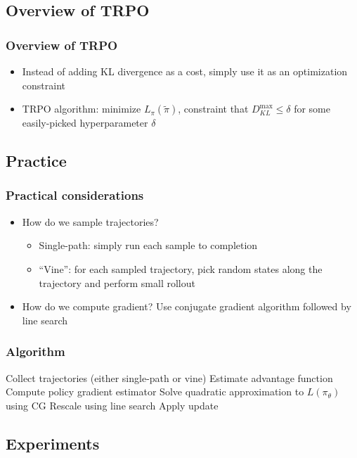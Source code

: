 \documentclass{beamer}
\begin{document}
\subsection{Overview of TRPO}
\begin{frame}
  \frametitle{Overview of TRPO}
  \begin{itemize}
    \item Instead of adding KL divergence as a cost, simply use it as an optimization constraint
    \item TRPO algorithm: minimize $L_\pi(\tilde{\pi})$, constraint that $D_{KL}^{\max} \leq \delta$ for some easily-picked hyperparameter $\delta$
  \end{itemize}
\end{frame}

\subsection{Practice}

\begin{frame}
  \frametitle{Practical considerations}
  \begin{itemize}
    \item How do we sample trajectories?
      \begin{itemize}
        \item Single-path: simply run each sample to completion
        \item ``Vine'': for each sampled trajectory, pick random states along the trajectory and perform small rollout
      \end{itemize}
    \item How do we compute gradient? Use conjugate gradient algorithm followed by line search
  \end{itemize}
\end{frame}

\begin{frame}
  \frametitle{Algorithm}
  \begin{algorithmic}
      \State Collect trajectories (either single-path or vine)
      \State Estimate advantage function
      \State Compute policy gradient estimator
      \State Solve quadratic approximation to $L(\pi_\theta)$ using CG
      \State Rescale using line search
      \State Apply update
    \EndWhile
  \end{algorithmic}
\end{frame}

\subsection{Experiments}
\end{document}

